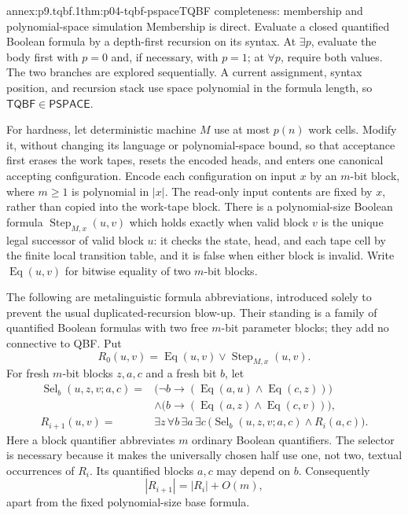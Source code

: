 \begin{annexitem}{annex:p9.tqbf.1}{thm:p04-tqbf-pspace}{TQBF completeness: membership and polynomial-space simulation}
Membership is direct.  Evaluate a closed quantified Boolean formula by a
depth-first recursion on its syntax.  At \(\exists p\), evaluate the body first
with \(p=0\) and, if necessary, with \(p=1\); at \(\forall p\), require both
values.  The two branches are explored sequentially.  A current assignment,
syntax position, and recursion stack use space polynomial in the formula
length, so \(\mathsf{TQBF}\in\mathsf{PSPACE}\).

For hardness, let deterministic machine \(M\) use at most \(p(n)\) work cells.
Modify it, without changing its language or polynomial-space bound, so that
acceptance first erases the work tapes, resets the encoded heads, and enters
one canonical accepting configuration.  Encode each configuration on input
\(x\) by an \(m\)-bit block, where \(m\geq1\) is polynomial in \(|x|\).
The read-only input contents are fixed by \(x\), rather than copied into the
work-tape block.
There is a polynomial-size Boolean formula
\(\operatorname{Step}_{M,x}(u,v)\) which holds exactly when valid block \(v\)
is the unique legal successor of valid block \(u\): it checks the state, head,
and each tape cell by the finite local transition table, and it is false when
either block is invalid.  Write
\(\operatorname{Eq}(u,v)\) for bitwise equality of two \(m\)-bit blocks.

The following are metalinguistic formula abbreviations, introduced solely to
prevent the usual duplicated-recursion blow-up.  Their standing is a family of
quantified Boolean formulas with two free \(m\)-bit parameter blocks; they add
no connective to QBF.  Put
\[
 R_0(u,v)=\operatorname{Eq}(u,v)\lor
           \operatorname{Step}_{M,x}(u,v).
\]
For fresh \(m\)-bit blocks \(z,a,c\) and a fresh bit \(b\), let
\[
\begin{aligned}
 \operatorname{Sel}_b(u,z,v;a,c)
  ={}&\bigl(\neg b\to
       (\operatorname{Eq}(a,u)\land\operatorname{Eq}(c,z))\bigr)\\
    &\land\bigl(b\to
       (\operatorname{Eq}(a,z)\land\operatorname{Eq}(c,v))\bigr),\\
 R_{i+1}(u,v)
  ={}&\exists z\,\forall b\,\exists a\,\exists c\,
       \bigl(\operatorname{Sel}_b(u,z,v;a,c)\land R_i(a,c)\bigr).
\end{aligned}
\]
Here a block quantifier abbreviates \(m\) ordinary Boolean quantifiers.  The
selector is necessary because it makes the universally chosen half use one,
not two, textual occurrences of \(R_i\).  Its quantified blocks \(a,c\) may
depend on \(b\).  Consequently
\[
 |R_{i+1}|=|R_i|+O(m),
\]
apart from the fixed polynomial-size base formula.


\end{annexitem}
